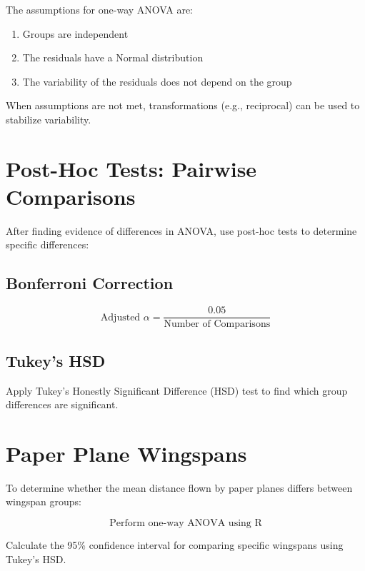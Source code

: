 \documentclass{article}
\begin{document}
The assumptions for one-way ANOVA are:

\begin{enumerate}
    \item Groups are independent
    \item The residuals have a Normal distribution
    \item The variability of the residuals does not depend on the group
\end{enumerate}

When assumptions are not met, transformations (e.g., reciprocal) can be used to stabilize variability.

\section{Post-Hoc Tests: Pairwise Comparisons}

After finding evidence of differences in ANOVA, use post-hoc tests to determine specific differences:

\subsection{Bonferroni Correction}

\[
\text{Adjusted } \alpha = \frac{0.05}{\text{Number of Comparisons}}
\]

\subsection{Tukey's HSD}

Apply Tukey's Honestly Significant Difference (HSD) test to find which group differences are significant. 

\section{Paper Plane Wingspans}

To determine whether the mean distance flown by paper planes differs between wingspan groups:

\[
\text{Perform one-way ANOVA using R}
\]

Calculate the 95\% confidence interval for comparing specific wingspans using Tukey's HSD.
\end{document}
